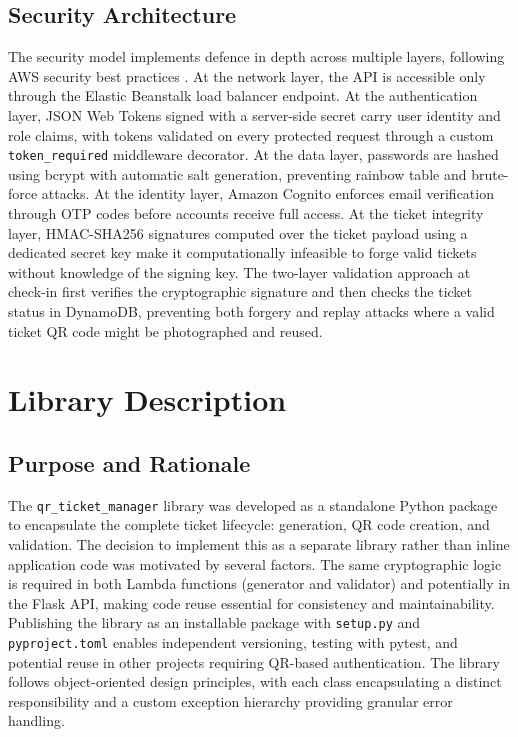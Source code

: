 \documentclass[conference]{IEEEtran}
\begin{document}
\subsection{Security Architecture}

The security model implements defence in depth across multiple layers, following AWS security best practices \cite{awsiam2024}. At the network layer, the API is accessible only through the Elastic Beanstalk load balancer endpoint. At the authentication layer, JSON Web Tokens signed with a server-side secret carry user identity and role claims, with tokens validated on every protected request through a custom \texttt{token\_required} middleware decorator. At the data layer, passwords are hashed using bcrypt with automatic salt generation, preventing rainbow table and brute-force attacks. At the identity layer, Amazon Cognito enforces email verification through OTP codes before accounts receive full access. At the ticket integrity layer, HMAC-SHA256 signatures computed over the ticket payload using a dedicated secret key make it computationally infeasible to forge valid tickets without knowledge of the signing key. The two-layer validation approach at check-in first verifies the cryptographic signature and then checks the ticket status in DynamoDB, preventing both forgery and replay attacks where a valid ticket QR code might be photographed and reused.

\section{Library Description}

\subsection{Purpose and Rationale}

The \texttt{qr\_ticket\_manager} library was developed as a standalone Python package to encapsulate the complete ticket lifecycle: generation, QR code creation, and validation. The decision to implement this as a separate library rather than inline application code was motivated by several factors. The same cryptographic logic is required in both Lambda functions (generator and validator) and potentially in the Flask API, making code reuse essential for consistency and maintainability. Publishing the library as an installable package with \texttt{setup.py} and \texttt{pyproject.toml} enables independent versioning, testing with pytest, and potential reuse in other projects requiring QR-based authentication. The library follows object-oriented design principles, with each class encapsulating a distinct responsibility and a custom exception hierarchy providing granular error handling.
\end{document}
